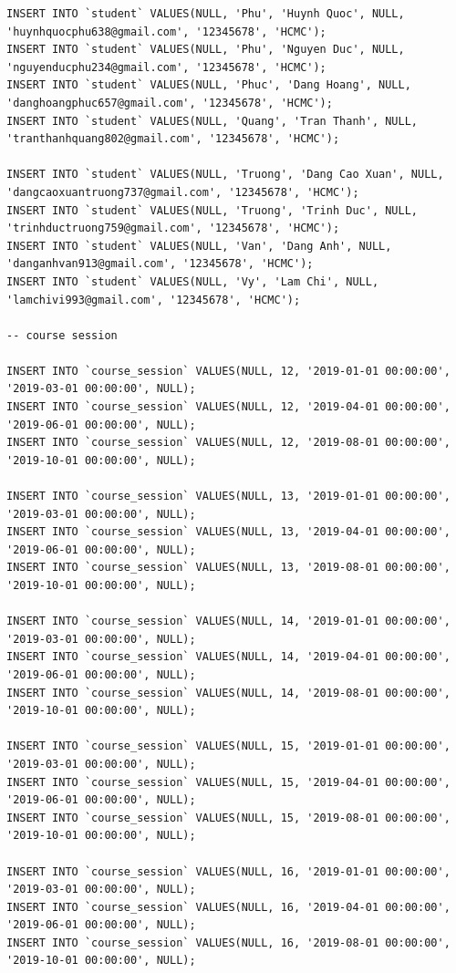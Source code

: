\documentclass[12pt,a4paper,titlepage]{article}
\begin{document}
\begin{lstlisting}
INSERT INTO `student` VALUES(NULL, 'Phu', 'Huynh Quoc', NULL, 'huynhquocphu638@gmail.com', '12345678', 'HCMC');
INSERT INTO `student` VALUES(NULL, 'Phu', 'Nguyen Duc', NULL, 'nguyenducphu234@gmail.com', '12345678', 'HCMC');
INSERT INTO `student` VALUES(NULL, 'Phuc', 'Dang Hoang', NULL, 'danghoangphuc657@gmail.com', '12345678', 'HCMC');
INSERT INTO `student` VALUES(NULL, 'Quang', 'Tran Thanh', NULL, 'tranthanhquang802@gmail.com', '12345678', 'HCMC');

INSERT INTO `student` VALUES(NULL, 'Truong', 'Dang Cao Xuan', NULL, 'dangcaoxuantruong737@gmail.com', '12345678', 'HCMC');
INSERT INTO `student` VALUES(NULL, 'Truong', 'Trinh Duc', NULL, 'trinhductruong759@gmail.com', '12345678', 'HCMC');
INSERT INTO `student` VALUES(NULL, 'Van', 'Dang Anh', NULL, 'danganhvan913@gmail.com', '12345678', 'HCMC');
INSERT INTO `student` VALUES(NULL, 'Vy', 'Lam Chi', NULL, 'lamchivi993@gmail.com', '12345678', 'HCMC');

-- course session

INSERT INTO `course_session` VALUES(NULL, 12, '2019-01-01 00:00:00', '2019-03-01 00:00:00', NULL);
INSERT INTO `course_session` VALUES(NULL, 12, '2019-04-01 00:00:00', '2019-06-01 00:00:00', NULL);
INSERT INTO `course_session` VALUES(NULL, 12, '2019-08-01 00:00:00', '2019-10-01 00:00:00', NULL);

INSERT INTO `course_session` VALUES(NULL, 13, '2019-01-01 00:00:00', '2019-03-01 00:00:00', NULL);
INSERT INTO `course_session` VALUES(NULL, 13, '2019-04-01 00:00:00', '2019-06-01 00:00:00', NULL);
INSERT INTO `course_session` VALUES(NULL, 13, '2019-08-01 00:00:00', '2019-10-01 00:00:00', NULL);

INSERT INTO `course_session` VALUES(NULL, 14, '2019-01-01 00:00:00', '2019-03-01 00:00:00', NULL);
INSERT INTO `course_session` VALUES(NULL, 14, '2019-04-01 00:00:00', '2019-06-01 00:00:00', NULL);
INSERT INTO `course_session` VALUES(NULL, 14, '2019-08-01 00:00:00', '2019-10-01 00:00:00', NULL);

INSERT INTO `course_session` VALUES(NULL, 15, '2019-01-01 00:00:00', '2019-03-01 00:00:00', NULL);
INSERT INTO `course_session` VALUES(NULL, 15, '2019-04-01 00:00:00', '2019-06-01 00:00:00', NULL);
INSERT INTO `course_session` VALUES(NULL, 15, '2019-08-01 00:00:00', '2019-10-01 00:00:00', NULL);

INSERT INTO `course_session` VALUES(NULL, 16, '2019-01-01 00:00:00', '2019-03-01 00:00:00', NULL);
INSERT INTO `course_session` VALUES(NULL, 16, '2019-04-01 00:00:00', '2019-06-01 00:00:00', NULL);
INSERT INTO `course_session` VALUES(NULL, 16, '2019-08-01 00:00:00', '2019-10-01 00:00:00', NULL);


\end{lstlisting}
\end{document}
